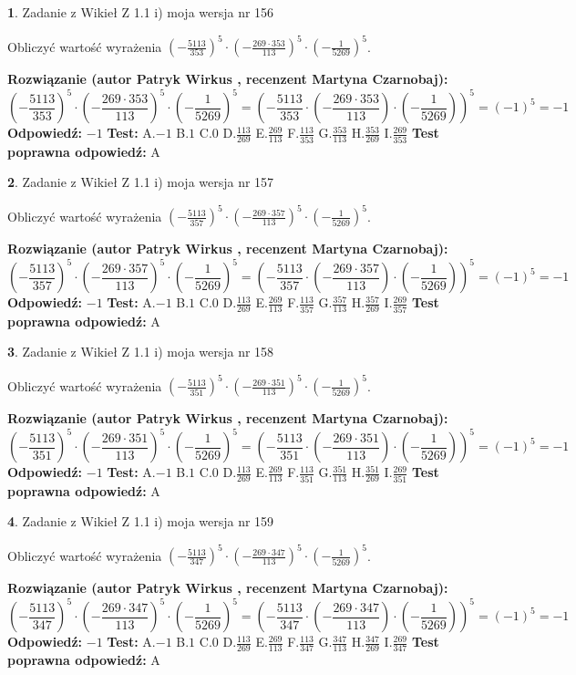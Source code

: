 \documentclass[12pt, a4paper]{article}
\theoremstyle{definition} %
\newtheorem{zad}{}
\newcommand{\zadStart}[1]{\begin{zad}#1\newline}
\newcommand{\zadStop}{\end{zad}}
\newcommand{\rozwStart}[2]{\noindent \textbf{Rozwiązanie (autor #1 , recenzent #2): }\newline}
\newcommand{\rozwStop}{\newline}
\newcommand{\odpStart}{\noindent \textbf{Odpowiedź:}\newline}
\newcommand{\odpStop}{\newline}
\newcommand{\testStart}{\noindent \textbf{Test:}\newline}
\newcommand{\testStop}{\newline}
\newcommand{\kluczStart}{\noindent \textbf{Test poprawna odpowiedź:}\newline}
\newcommand{\kluczStop}{\newline}
\begin{document}
\zadStart{Zadanie z Wikieł Z 1.1 i) moja wersja nr 156}

Obliczyć wartość wyrażenia $(-\frac{5113}{353})^{5} \cdot (-\frac{269 \cdot 353}{113})^{5} \cdot (-\frac{1}{5269})^{5}$.
\zadStop
\rozwStart{Patryk Wirkus}{Martyna Czarnobaj}
$$(-\frac{5113}{353})^{5} \cdot (-\frac{269 \cdot 353}{113})^{5} \cdot (-\frac{1}{5269})^{5} = (-\frac{5113}{353} \cdot (-\frac{269 \cdot 353}{113}) \cdot (-\frac{1}{5269}))^{5} = (-1)^{5} = -1$$
\rozwStop
\odpStart
$-1$
\odpStop
\testStart
A.$-1$ B.$1$ C.$0$ D.$\frac{113}{269}$ E.$\frac{269}{113}$
F.$\frac{113}{353}$ G.$\frac{353}{113}$
H.$\frac{353}{269}$
I.$\frac{269}{353}$
\testStop
\kluczStart
A
\kluczStop



\zadStart{Zadanie z Wikieł Z 1.1 i) moja wersja nr 157}

Obliczyć wartość wyrażenia $(-\frac{5113}{357})^{5} \cdot (-\frac{269 \cdot 357}{113})^{5} \cdot (-\frac{1}{5269})^{5}$.
\zadStop
\rozwStart{Patryk Wirkus}{Martyna Czarnobaj}
$$(-\frac{5113}{357})^{5} \cdot (-\frac{269 \cdot 357}{113})^{5} \cdot (-\frac{1}{5269})^{5} = (-\frac{5113}{357} \cdot (-\frac{269 \cdot 357}{113}) \cdot (-\frac{1}{5269}))^{5} = (-1)^{5} = -1$$
\rozwStop
\odpStart
$-1$
\odpStop
\testStart
A.$-1$ B.$1$ C.$0$ D.$\frac{113}{269}$ E.$\frac{269}{113}$
F.$\frac{113}{357}$ G.$\frac{357}{113}$
H.$\frac{357}{269}$
I.$\frac{269}{357}$
\testStop
\kluczStart
A
\kluczStop



\zadStart{Zadanie z Wikieł Z 1.1 i) moja wersja nr 158}

Obliczyć wartość wyrażenia $(-\frac{5113}{351})^{5} \cdot (-\frac{269 \cdot 351}{113})^{5} \cdot (-\frac{1}{5269})^{5}$.
\zadStop
\rozwStart{Patryk Wirkus}{Martyna Czarnobaj}
$$(-\frac{5113}{351})^{5} \cdot (-\frac{269 \cdot 351}{113})^{5} \cdot (-\frac{1}{5269})^{5} = (-\frac{5113}{351} \cdot (-\frac{269 \cdot 351}{113}) \cdot (-\frac{1}{5269}))^{5} = (-1)^{5} = -1$$
\rozwStop
\odpStart
$-1$
\odpStop
\testStart
A.$-1$ B.$1$ C.$0$ D.$\frac{113}{269}$ E.$\frac{269}{113}$
F.$\frac{113}{351}$ G.$\frac{351}{113}$
H.$\frac{351}{269}$
I.$\frac{269}{351}$
\testStop
\kluczStart
A
\kluczStop



\zadStart{Zadanie z Wikieł Z 1.1 i) moja wersja nr 159}

Obliczyć wartość wyrażenia $(-\frac{5113}{347})^{5} \cdot (-\frac{269 \cdot 347}{113})^{5} \cdot (-\frac{1}{5269})^{5}$.
\zadStop
\rozwStart{Patryk Wirkus}{Martyna Czarnobaj}
$$(-\frac{5113}{347})^{5} \cdot (-\frac{269 \cdot 347}{113})^{5} \cdot (-\frac{1}{5269})^{5} = (-\frac{5113}{347} \cdot (-\frac{269 \cdot 347}{113}) \cdot (-\frac{1}{5269}))^{5} = (-1)^{5} = -1$$
\rozwStop
\odpStart
$-1$
\odpStop
\testStart
A.$-1$ B.$1$ C.$0$ D.$\frac{113}{269}$ E.$\frac{269}{113}$
F.$\frac{113}{347}$ G.$\frac{347}{113}$
H.$\frac{347}{269}$
I.$\frac{269}{347}$
\testStop
\kluczStart
A
\kluczStop
\end{document}
